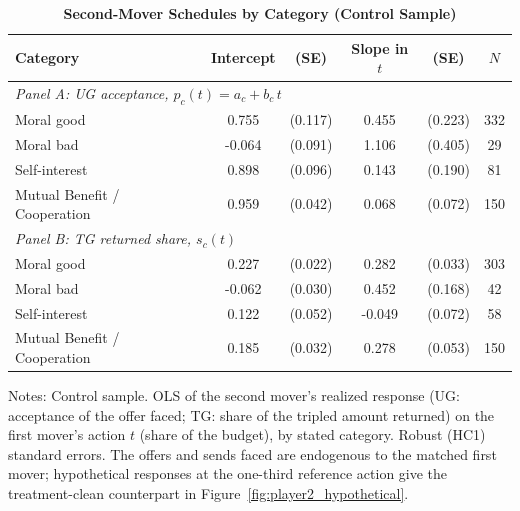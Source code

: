 \begin{table}[!htbp]
\centering
\footnotesize
\renewcommand{\arraystretch}{1.15}
\caption{\textbf{Second-Mover Schedules by Category (Control Sample)}}
\label{tab:p2_schedules}
\begin{tabular}{l cc cc c}
\toprule
Category & Intercept & (SE) & Slope in $t$ & (SE) & $N$ \\
\midrule
\multicolumn{6}{l}{\emph{Panel A: UG acceptance, $p_c(t)=a_c+b_c\,t$}} \\
Moral good & 0.755 & (0.117) & 0.455 & (0.223) & 332 \\
Moral bad & -0.064 & (0.091) & 1.106 & (0.405) & 29 \\
Self-interest & 0.898 & (0.096) & 0.143 & (0.190) & 81 \\
Mutual Benefit / Cooperation & 0.959 & (0.042) & 0.068 & (0.072) & 150 \\
\midrule
\multicolumn{6}{l}{\emph{Panel B: TG returned share, $s_c(t)$}} \\
Moral good & 0.227 & (0.022) & 0.282 & (0.033) & 303 \\
Moral bad & -0.062 & (0.030) & 0.452 & (0.168) & 42 \\
Self-interest & 0.122 & (0.052) & -0.049 & (0.072) & 58 \\
Mutual Benefit / Cooperation & 0.185 & (0.032) & 0.278 & (0.053) & 150 \\
\bottomrule
\end{tabular}
\begin{flushleft}
\footnotesize Notes: Control sample. OLS of the second mover's realized response (UG: acceptance of the offer faced; TG: share of the tripled amount returned) on the first mover's action $t$ (share of the budget), by stated category. Robust (HC1) standard errors. The offers and sends faced are endogenous to the matched first mover; hypothetical responses at the one-third reference action give the treatment-clean counterpart in Figure~\ref{fig:player2_hypothetical}.
\end{flushleft}
\end{table}
